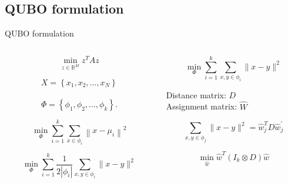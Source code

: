 \subsection{QUBO formulation}
	\begin{frame}{QUBO formulation}
		\begin{columns}
			\begin{column}{0.5\textwidth}
				$$\min _{z \in \mathbb{B}^{M}} z^{T} A z$$

				$$X=\left\{x_{1}, x_{2}, \ldots, x_{N}\right\}$$\\$$\Phi=\left\{\phi_{1}, \phi_{2}, \ldots, \phi_{k}\right\} .$$

				$$\min _{\Phi} \sum_{i=1}^{k} \sum_{x \in \phi_{i}}\left\|x-\mu_{i}\right\|^{2}$$

				$$\min _{\Phi} \sum_{i=1}^{k} \frac{1}{2\left|\phi_{i}\right|} \sum_{x, y \in \phi_{i}}\|x-y\|^{2}$$

			\end{column}
			\begin{column}{0.5\textwidth}  
				$$\min _{\Phi} \sum_{i=1}^{k} \sum_{x, y \in \phi_{i}}\|x-y\|^{2}$$

				Distance matrix: $D$ \\Assignment matrix: $\hat W$

				$$\sum_{x, y \in \phi_{j}}\|x-y\|^{2}=\hat{w}_{j}^{T} D \hat{w}_{j}^{\prime}$$

				$$\min _{\hat{w}} \hat{w}^{T}\left(I_{k} \otimes D\right) \hat{w}$$
			\end{column}
		\end{columns}
	\end{frame}

